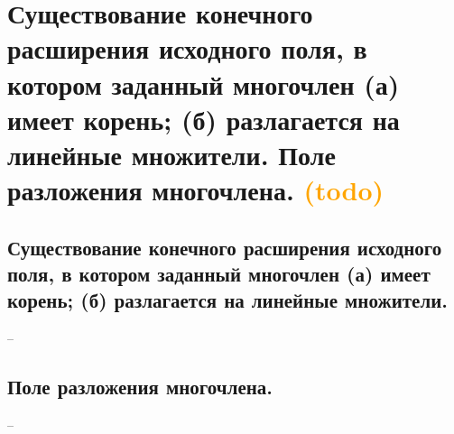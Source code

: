\section{Существование конечного расширения исходного поля, в котором заданный многочлен (а) имеет корень; (б) разлагается на линейные множители. Поле разложения многочлена. \textcolor{orange}{(todo)}}

\subsection{Существование конечного расширения исходного поля, в котором заданный многочлен (а) имеет корень; (б) разлагается на линейные множители.}
--

\subsection{Поле разложения многочлена.}
--

